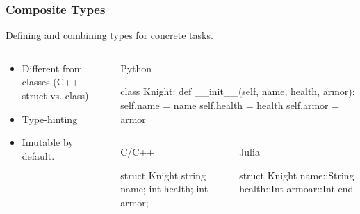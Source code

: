 \documentclass[compress,aspectratio=169]{beamer}
\begin{document}
\begin{frame}[fragile] %
    \frametitle{Composite Types}
    Defining and combining types for concrete tasks.

    \begin{columns}
        \begin{column}{0.4\textwidth}
            \begin{itemize}
                \item Different from classes (C++ struct vs. class)
                \item Type-hinting
                \item Imutable by default.
            \end{itemize}
        \end{column}
        \begin{column}{0.6\textwidth}
            Python
            \begin{jllisting}[gobble=16, language=python]
                class Knight:
                    def __init__(self, name, health, armor):
                        self.name = name
                        self.health = health
                        self.armor = armor
            \end{jllisting}
            \begin{columns}
                \begin{column}{0.5\textwidth}
                    C/C++
                    \begin{jllisting}[gobble=24,language=c]
                        struct Knight {
                            string name;
                            int health;
                            int armor;
                        }
                    \end{jllisting}
                \end{column}
                \begin{column}{0.5\textwidth}
                    Julia
                    \begin{jllisting}[gobble=24]
                        struct Knight
                            name::String
                            health::Int
                            armoar::Int
                        end
                    \end{jllisting}
                \end{column}
            \end{columns}
        \end{column}
    \end{columns}
\end{frame}
\end{document}
